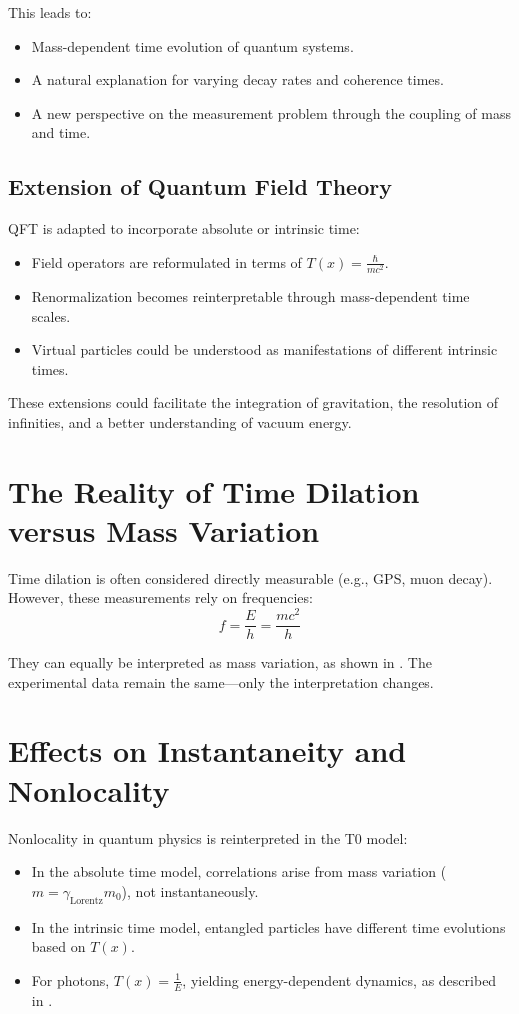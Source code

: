 \documentclass[a4paper,12pt]{article}
\newcommand{\Tfield}{T(x)}
\newcommand{\gammaf}{\gamma_{\text{Lorentz}}}
\begin{document}
	This leads to:
	\begin{itemize}
		\item Mass-dependent time evolution of quantum systems.
		\item A natural explanation for varying decay rates and coherence times.
		\item A new perspective on the measurement problem through the coupling of mass and time.
	\end{itemize}
	
	\subsection{Extension of Quantum Field Theory}
	
	QFT is adapted to incorporate absolute or intrinsic time:
	\begin{itemize}
		\item Field operators are reformulated in terms of \(\Tfield = \frac{\hbar}{m c^2}\).
		\item Renormalization becomes reinterpretable through mass-dependent time scales.
		\item Virtual particles could be understood as manifestations of different intrinsic times.
	\end{itemize}
	
	These extensions could facilitate the integration of gravitation, the resolution of infinities, and a better understanding of vacuum energy.
	
	\section{The Reality of Time Dilation versus Mass Variation}
	
	Time dilation is often considered directly measurable (e.g., GPS, muon decay). However, these measurements rely on frequencies:
	\begin{equation}
		f = \frac{E}{h} = \frac{m c^2}{h}
	\end{equation}
	
	They can equally be interpreted as mass variation, as shown in \cite{pascher_planck_2025}. The experimental data remain the same—only the interpretation changes.
	
	\section{Effects on Instantaneity and Nonlocality}
	
	Nonlocality in quantum physics is reinterpreted in the T0 model:
	\begin{itemize}
		\item In the absolute time model, correlations arise from mass variation (\( m = \gammaf m_0 \)), not instantaneously.
		\item In the intrinsic time model, entangled particles have different time evolutions based on \(\Tfield\).
		\item For photons, \(\Tfield = \frac{1}{E}\), yielding energy-dependent dynamics, as described in \cite{pascher_photons_2025}.
	\end{itemize}
	
\end{document}
